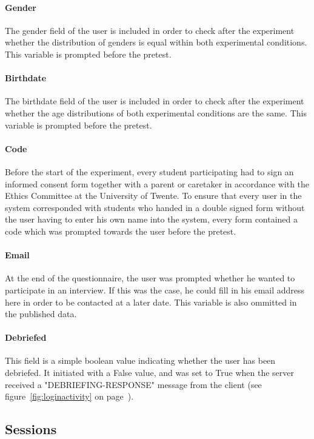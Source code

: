 \paragraph{Gender} The gender field of the user is included in order to check after the experiment whether the distribution of genders is equal within both experimental conditions. This variable is prompted before the pretest.

\paragraph{Birthdate} The birthdate field of the user is included in order to check after the experiment whether the age distributions of both experimental conditions are the same. This variable is prompted before the pretest.

\paragraph{Code} Before the start of the experiment, every student participating had to sign an informed consent form together with a parent or caretaker in accordance with the Ethics Committee at the University of Twente. To ensure that every user in the system corresponded with students who handed in a double signed form without the user having to enter his own name into the system, every form contained a code which was prompted towards the user before the pretest.

\paragraph{Email} At the end of the questionnaire, the user was prompted whether he wanted to participate in an interview. If this was the case, he could fill in his email address here in order to be contacted at a later date. This variable is also ommitted in the published data.

\paragraph{Debriefed} This field is a simple boolean value indicating whether the user has been debriefed. It initiated with a False value, and was set to True when the server received a "DEBRIEFING-RESPONSE" message from the client (see figure~\ref{fig:loginactivity} on page~\pageref{fig:loginactivity}).

\subsection{Sessions}

